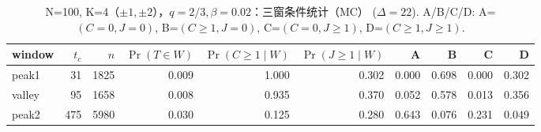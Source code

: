 \begin{table}[!htbp]
\centering
\scriptsize
\setlength{\tabcolsep}{4pt}
\begin{tabular}{lrrrrrrrrr}
\toprule
window & $t_c$ & $n$ & $\Pr(T\in W)$ & $\Pr(C\ge 1\mid W)$ & $\Pr(J\ge 1\mid W)$ & A & B & C & D\\
\midrule
peak1 & 31 & 1825 & 0.009 & 1.000 & 0.302 & 0.000 & 0.698 & 0.000 & 0.302\\
valley & 95 & 1658 & 0.008 & 0.935 & 0.370 & 0.052 & 0.578 & 0.013 & 0.356\\
peak2 & 475 & 5980 & 0.030 & 0.125 & 0.280 & 0.643 & 0.076 & 0.231 & 0.049\\
\bottomrule
\end{tabular}
\caption{N=100, K=4（$\pm1,\pm2$），$q=2/3,\beta=0.02$：三窗条件统计（MC） ($\Delta=22$). A/B/C/D: A=$(C=0,J=0)$, B=$(C\ge 1,J=0)$, C=$(C=0,J\ge 1)$, D=$(C\ge 1,J\ge 1)$.}
\label{tab:case-window-N100-K4-beta002}
\end{table}
